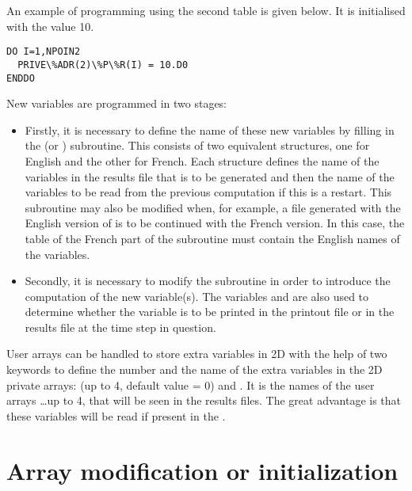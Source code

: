 An example of programming using the second  table is given below.
It is initialised with the value 10.

\begin{lstlisting}[language=TelFortran]
DO I=1,NPOIN2
  PRIVE\%ADR(2)\%P\%R(I) = 10.D0
ENDDO
\end{lstlisting}

New variables are programmed in two stages:

\begin{itemize}
\item  Firstly, it is necessary to define the name of these new variables by
filling in the  (or )
subroutine. This consists of two equivalent structures, one for English and the
other for French. Each structure defines the name of the variables in the
results file that is to be generated and then the name of the variables to be
read from the previous computation if this is a restart. This subroutine
may also be modified when, for example, a file generated with the English
version of  is to be continued with the French version. In this
case, the  table of the French part of the subroutine must
contain the English names of the variables.

\item  Secondly, it is necessary to modify the 
subroutine in order to introduce the computation of the new variable(s). The
variables  and  are also used to
determine whether the variable is to be printed in the printout file or in
the results file at the time step in question.
\end{itemize}

User arrays can be handled to store extra variables in 2D with the help of
two keywords to define the number and the name of the extra variables
in the 2D private arrays:  (up to 4,
default value = 0) and .
It is the names of the user arrays 
\ldots up to 4, that will be seen in the results files.
The great advantage is that these variables will be read if present in the
.

\section{Array modification or initialization}

